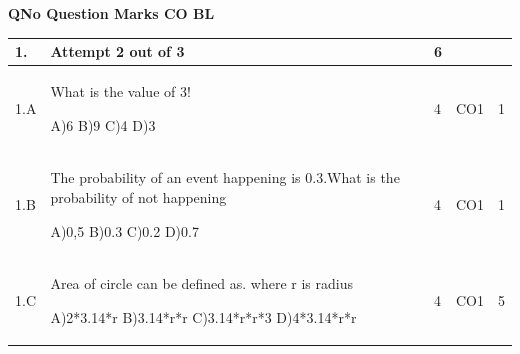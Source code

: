 \documentclass[12pt]{article}
\begin{document}
	\begin{flushleft}
	\bf{QNo}\hspace{1.2cm} \bf{Question} \hspace{5.5cm}  \bf{Marks} \hspace{0.2cm} \bf{CO} \hspace{0.2cm}	\bf{BL}	
	
\end{flushleft} 
	\begin{longtable}{|L{1cm}|L{8cm}|C{1cm}|C{1cm}|C{1cm}|}\hline
		\bf{1}. & \bf{Attempt} \bf2 \bf{out} of \bf3 & \bf6  & & \\ \hline
				1.A & What is the value of 3! \newline
					
		A)6\newline
		B)9\newline
		C)4\newline
		D)3 &
		4 &
		CO1&
		1 \\ \hline
		
				1.B & The probability of an event happening is 0.3.What is the probability of not happening \newline
					
		A)0,5\newline
		B)0.3\newline
		C)0.2\newline
		D)0.7 &
		4 &
		CO1&
		1 \\ \hline
		
				1.C & Area of circle can be defined as. where r is radius \newline
					
		A)2*3.14*r\newline
		B)3.14*r*r\newline
		C)3.14*r*r*3\newline
		D)4*3.14*r*r &
		4 &
		CO1&
		5 \\ \hline
		
		
	\end{longtable}
\end{document}
